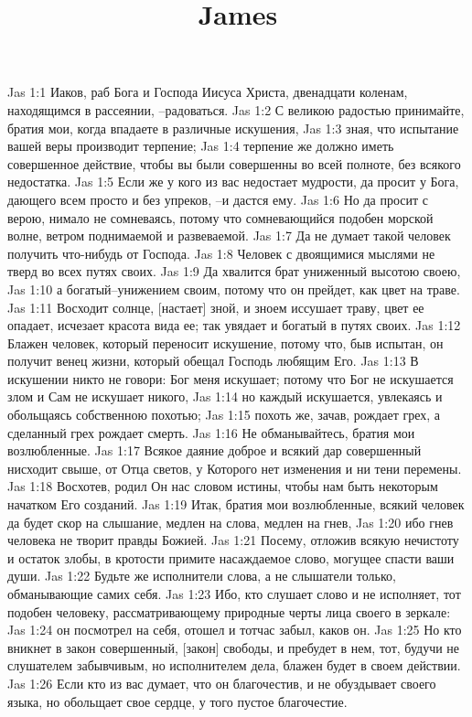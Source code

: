 

\title{James}

Jas 1:1  Иаков, раб Бога и Господа Иисуса Христа, двенадцати коленам, находящимся в рассеянии, --радоваться.
Jas 1:2  С великою радостью принимайте, братия мои, когда впадаете в различные искушения,
Jas 1:3  зная, что испытание вашей веры производит терпение;
Jas 1:4  терпение же должно иметь совершенное действие, чтобы вы были совершенны во всей полноте, без всякого недостатка.
Jas 1:5  Если же у кого из вас недостает мудрости, да просит у Бога, дающего всем просто и без упреков, --и дастся ему.
Jas 1:6  Но да просит с верою, нимало не сомневаясь, потому что сомневающийся подобен морской волне, ветром поднимаемой и развеваемой.
Jas 1:7  Да не думает такой человек получить что-нибудь от Господа.
Jas 1:8  Человек с двоящимися мыслями не тверд во всех путях своих.
Jas 1:9  Да хвалится брат униженный высотою своею,
Jas 1:10  а богатый--унижением своим, потому что он прейдет, как цвет на траве.
Jas 1:11  Восходит солнце, [настает] зной, и зноем иссушает траву, цвет ее опадает, исчезает красота вида ее; так увядает и богатый в путях своих.
Jas 1:12  Блажен человек, который переносит искушение, потому что, быв испытан, он получит венец жизни, который обещал Господь любящим Его.
Jas 1:13  В искушении никто не говори: Бог меня искушает; потому что Бог не искушается злом и Сам не искушает никого,
Jas 1:14  но каждый искушается, увлекаясь и обольщаясь собственною похотью;
Jas 1:15  похоть же, зачав, рождает грех, а сделанный грех рождает смерть.
Jas 1:16  Не обманывайтесь, братия мои возлюбленные.
Jas 1:17  Всякое даяние доброе и всякий дар совершенный нисходит свыше, от Отца светов, у Которого нет изменения и ни тени перемены.
Jas 1:18  Восхотев, родил Он нас словом истины, чтобы нам быть некоторым начатком Его созданий.
Jas 1:19  Итак, братия мои возлюбленные, всякий человек да будет скор на слышание, медлен на слова, медлен на гнев,
Jas 1:20  ибо гнев человека не творит правды Божией.
Jas 1:21  Посему, отложив всякую нечистоту и остаток злобы, в кротости примите насаждаемое слово, могущее спасти ваши души.
Jas 1:22  Будьте же исполнители слова, а не слышатели только, обманывающие самих себя.
Jas 1:23  Ибо, кто слушает слово и не исполняет, тот подобен человеку, рассматривающему природные черты лица своего в зеркале:
Jas 1:24  он посмотрел на себя, отошел и тотчас забыл, каков он.
Jas 1:25  Но кто вникнет в закон совершенный, [закон] свободы, и пребудет в нем, тот, будучи не слушателем забывчивым, но исполнителем дела, блажен будет в своем действии.
Jas 1:26  Если кто из вас думает, что он благочестив, и не обуздывает своего языка, но обольщает свое сердце, у того пустое благочестие.
